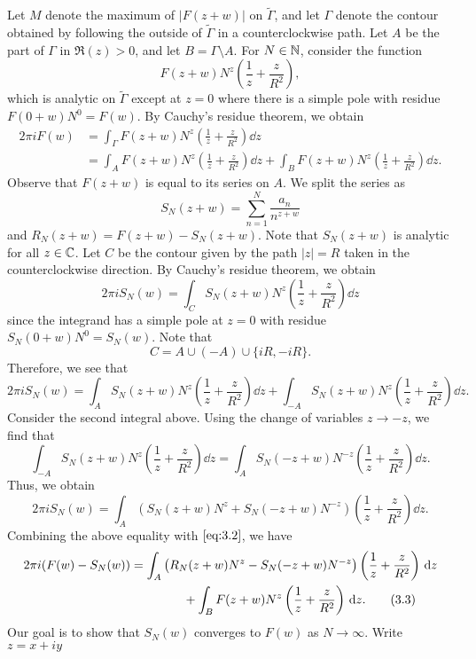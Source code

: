 \begin{pf}
Let $M$ denote the maximum of $|F(z+w)|$ on $\tilde \Gamma$, and let $\Gamma$ denote the contour 
obtained by following the outside of $\tilde\Gamma$ in a counterclockwise path. Let $A$ be the 
part of $\Gamma$ in $\Re(z) > 0$, and let $B = \Gamma \setminus A$. For $N \in \mathbb{N}$, consider the 
function 
\[ F(z+w)N^z \left( \frac1z + \frac z{R^2} \right), \]
which is analytic on $\tilde\Gamma$ except at $z = 0$ where there is a simple pole with residue 
$F(0+w) N^0 = F(w)$. By Cauchy's residue theorem, we obtain 
\begin{align*}
    2\pi i F(w) &= \int_\Gamma F(z+w) N^z \left( \frac1z + \frac z{R^2} \right)\dd z \\
    &= \int_A F(z+w) N^z \left( \frac1z + \frac z{R^2} \right)\dd z + 
    \int_B F(z+w) N^z \left( \frac1z + \frac z{R^2} \right)\dd z. \tag{3.2}\label{eq:3.2} 
\end{align*}
Observe that $F(z+w)$ is equal to its series on $A$. We split the series as 
\[ S_N(z+w) = \sum_{n=1}^N \frac{a_n}{n^{z+w}} \]
and $R_N(z+w) = F(z+w) - S_N(z+w)$. Note that $S_N(z+w)$ is analytic for all $z \in \mathbb{C}$. Let 
$C$ be the contour given by the path $|z| = R$ taken in the counterclockwise direction. 
By Cauchy's residue theorem, we obtain 
\[ 2\pi i S_N(w) = \int_C S_N(z+w) N^z \left( \frac1z + \frac z{R^2} \right)\dd z \]
since the integrand has a simple pole at $z = 0$ with residue $S_N(0+w) N^0 = S_N(w)$. Note that 
\[ C = A \cup (-A) \cup \{iR, -iR\}. \]
Therefore, we see that 
\[ 2\pi i S_N(w) = \int_A S_N(z+w) N^z \left( \frac1z + \frac z{R^2} \right)\dd z 
+ \int_{-A} S_N(z+w) N^z \left( \frac1z + \frac z{R^2} \right)\dd z. \]
Consider the second integral above. Using the change of variables $z \to -z$, we find that 
\[ \int_{-A} S_N(z+w) N^z \left( \frac1z + \frac z{R^2} \right)\dd z 
= \int_A S_N(-z+w) N^{-z} \left( \frac1z + \frac z{R^2} \right) \dd z. \]
Thus, we obtain 
\[ 2\pi i S_N(w) = \int_A \left( S_N(z+w) N^z + S_N(-z + w) N^{-z} \right) \left( \frac1z + \frac{z}{R^2} \right)\dd z. \]
Combining the above equality with $\eqref{eq:3.2}$, we have 
\begin{align*}
    2\pi i(F(w) - S_N(w)) 
    &= \int_A \left( R_N(z+w) N^z - S_N(-z+w) N^{-z} \right) 
    \left( \frac1z + \frac z{R^2} \right) \,\mathrm{d} z \\ 
    &\hspace{1.5cm} + \int_B F(z+w) N^z \left( \frac1z + \frac z{R^2} \right)\,\mathrm{d} z. 
    \tag{3.3}\label{eq:3.3}
\end{align*}  
Our goal is to show that $S_N(w)$ converges to $F(w)$ as $N \to \infty$. Write $z = x + iy$

\end{pf}
